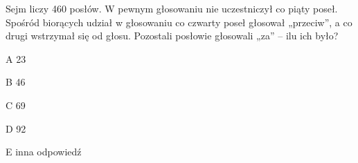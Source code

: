 \begin{tresc}
Sejm liczy 460 posłów. W pewnym głosowaniu nie uczestniczył co piąty poseł. Spośród biorących udział w głosowaniu co czwarty poseł głosował „przeciw”, a co drugi wstrzymał się od głosu. Pozostali posłowie głosowali „za” – ilu ich było?
\end{tresc}
\begin{wariant}{A} 23 \end{wariant}
\begin{wariant}{B} 46 \end{wariant}
\begin{wariant}{C} 69 \end{wariant}
\begin{wariant}{D} 92 \end{wariant}
\begin{wariant}{E} inna odpowiedź \end{wariant}
